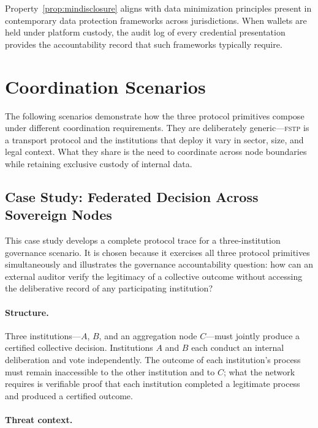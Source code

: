 \documentclass[12pt]{article}
\newcommand{\FSTP}{\textsc{fstp}}
\begin{document}
	Property~\ref{prop:mindisclosure} aligns with data minimization
	principles present in contemporary data protection frameworks across
	jurisdictions. When wallets are held under platform custody, the audit
	log of every credential presentation provides the accountability
	record that such frameworks typically require.
	
	
	\section{Coordination Scenarios}
	\label{sec:scenarios}
	
	The following scenarios demonstrate how the three protocol primitives
	compose under different coordination requirements. They are
	deliberately generic---\FSTP{} is a transport protocol and the
	institutions that deploy it vary in sector, size, and legal context.
	What they share is the need to coordinate across node boundaries while
	retaining exclusive custody of internal data.
	
	\subsection{Case Study: Federated Decision Across Sovereign Nodes}
	\label{sec:scenario:b}
	
	This case study develops a complete protocol trace for a
	three-institution governance scenario. It is chosen because it
	exercises all three protocol primitives simultaneously and
	illustrates the governance accountability question: how can an
	external auditor verify the legitimacy of a collective outcome without
	accessing the deliberative record of any participating institution?
	
	\paragraph{Structure.}
	
	Three institutions---$A$, $B$, and an aggregation node $C$---must
	jointly produce a certified collective decision. Institutions $A$ and
	$B$ each conduct an internal deliberation and vote independently. The
	outcome of each institution's process must remain inaccessible to the
	other institution and to $C$; what the network requires is verifiable
	proof that each institution completed a legitimate process and
	produced a certified outcome.
	
	\paragraph{Threat context.}
	
\end{document}
